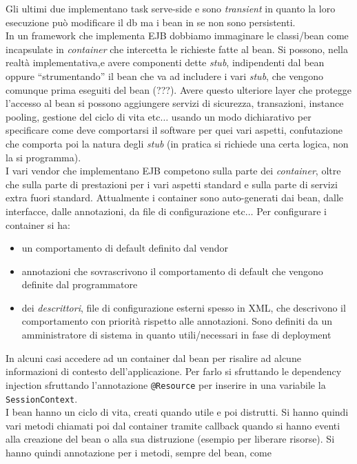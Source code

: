 \documentclass[a4paper,12pt, oneside]{book}
\begin{document}
Gli ultimi due implementano task serve-side e sono \textit{transient} in quanto
la loro esecuzione può modificare il db ma i bean in se non sono persistenti.\\
In un framework che implementa EJB dobbiamo immaginare le classi/bean come
incapsulate in \textit{container} che intercetta le richieste fatte al bean. Si
possono, nella realtà implementativa,e avere componenti dette \textit{stub},
indipendenti dal bean oppure ``strumentando'' il bean che va ad includere i
vari \textit{stub}, che vengono comunque prima eseguiti del bean (???). Avere
questo ulteriore layer che protegge l'accesso al bean si possono aggiungere
servizi di sicurezza, transazioni, instance pooling, gestione del ciclo di vita
etc$\ldots$ usando un modo dichiarativo per specificare come deve comportarsi il
software per quei vari aspetti, confutazione che comporta poi la natura degli
\textit{stub} (in pratica si richiede una certa logica, non la si programma).\\
I vari vendor che implementano EJB competono sulla parte dei \textit{container},
oltre che sulla parte di prestazioni per i vari aspetti standard e sulla parte
di servizi extra fuori standard. Attualmente i container sono auto-generati dai
bean, dalle interfacce, dalle annotazioni, da file di configurazione etc$\ldots$
Per configurare i container si ha:
\begin{itemize}
  \item un comportamento di default definito dal vendor
  \item annotazioni che sovrascrivono il comportamento di default che vengono
  definite dal programmatore
  \item dei \textit{descrittori}, file di configurazione esterni spesso in XML,
  che descrivono il comportamento con priorità rispetto alle annotazioni. Sono
  definiti da un amministratore di sistema in quanto utili/necessari in fase di
  deployment  
\end{itemize}
In alcuni casi accedere ad un container dal bean per risalire ad alcune
informazioni di contesto dell'applicazione. Per farlo si sfruttando le
dependency injection sfruttando l'annotazione \texttt{@Resource} per inserire in
una variabile la \texttt{SessionContext}.\\
I bean hanno un ciclo di vita, creati quando utile e poi distrutti. Si hanno
quindi vari metodi chiamati poi dal container tramite callback quando si hanno
eventi alla creazione del bean o alla sua distruzione (esempio per liberare
risorse). Si hanno quindi annotazione per i metodi, sempre del bean, come
\end{document}
